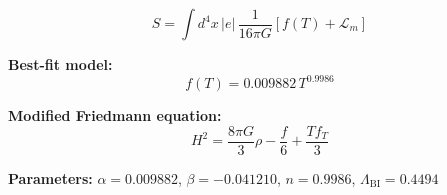 
\begin{equation}
  S = \int d^4x \, |e| \, \frac{1}{16\pi G} \left[ f(T) + \mathcal{L}_m \right]
\end{equation}

\textbf{Best-fit model:}
\begin{equation}
  f(T) = 0.009882 \, T^{0.9986}
\end{equation}

\textbf{Modified Friedmann equation:}
\begin{equation}
  H^2 = \frac{8\pi G}{3} \rho - \frac{f}{6} + \frac{T f_T}{3}
\end{equation}

\textbf{Parameters:}
$\alpha = 0.009882$, \quad
$\beta = -0.041210$, \quad
$n = 0.9986$, \quad
$\Lambda_{\text{BI}} = 0.4494$